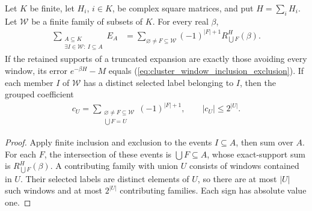 \begin{lemma}
    \label{thm:cluster_window_inclusion_exclusion}
    \leanok
    Let $K$ be finite, let $H_i$, $i\in K$, be complex square matrices,
    and put $H=\sum_iH_i$. Let $\mathcal W$ be a finite family of subsets
    of $K$. For every real $\beta$,
    \begin{align}
        \sum_{\substack{A\subseteq K                   \\
                \exists I\in\mathcal W:\ I\subseteq A}}E_A
         & =\sum_{\varnothing\ne F\subseteq\mathcal W}
        (-1)^{|F|+1}R_{\bigcup F}^H(\beta).
        \label{eq:cluster_window_inclusion_exclusion}
    \end{align}
    If the retained supports of a truncated expansion are exactly those
    avoiding every window, its error $e^{-\beta H}-M$ equals
    (\ref{eq:cluster_window_inclusion_exclusion}).
    If each member $I$ of $\mathcal W$ has a distinct selected label
    belonging to $I$, then the grouped coefficient
    \begin{align}
        c_U=\sum_{\substack{\varnothing\ne F\subseteq\mathcal W \\
                \bigcup F=U}}(-1)^{|F|+1}
        ,\qquad |c_U|\leq2^{|U|}.
        \label{eq:cluster_window_coefficient}
    \end{align}
\end{lemma}
\begin{proof}\leanok
    Apply finite inclusion and exclusion to the events $I\subseteq A$,
    then sum over $A$. For each $F$, the intersection of these events is
    $\bigcup F\subseteq A$, whose exact-support sum is
    $R_{\bigcup F}^H(\beta)$.
    A contributing family with union $U$ consists of windows contained in
    $U$. Their selected labels are distinct elements of $U$, so there
    are at most $|U|$ such windows and at most $2^{|U|}$ contributing
    families. Each sign has absolute value one.
\end{proof}

